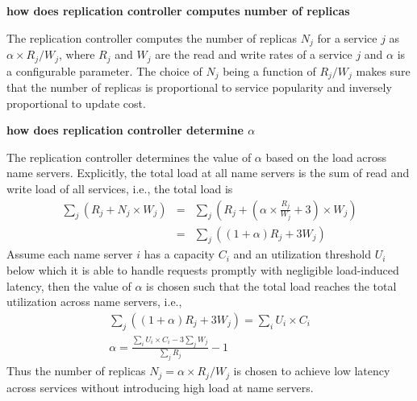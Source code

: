 {{		{\bf how does replication controller computes number of replicas}
		
		The replication controller computes the number of replicas $N_j$ for a service $j$ as $\alpha \times R_j/W_j$, where $R_j$ and $W_j$ are the read and write rates of a service $j$ and $\alpha$ is a configurable parameter. The choice of $N_j$ being a function of $R_j/W_j$ makes sure that the number of replicas is proportional to service popularity and inversely proportional to update cost.
		
		{\bf how does replication controller determine $\alpha$}
		
		The replication controller determines the value of $\alpha$ based on the load across name servers. Explicitly, the total load at all name servers is the sum of read and write load of all services, i.e., the total load is
		\begin{eqnarray}
		\sum_j (R_j + N_j \times W_j) & = & \sum_j (R_j + (\alpha \times \frac{R_j}{W_j} + 3) \times W_j)\nonumber \\ 
		& = & \sum_j ((1 + \alpha)R_j + 3W_j)
		\end{eqnarray}
		Assume each name server $i$ has a capacity $C_i$ and an utilization threshold $U_i$ below which it is able to handle requests promptly with negligible load-induced latency, then the value of $\alpha$ is chosen such that the total load reaches the total utilization across name servers, i.e., 
		\begin{eqnarray}
		\sum_j ( (1 + \alpha) R_j + 3W_j) = \sum_i U_i \times C_i \nonumber \\
		\alpha  =   \frac{\sum_i U_i \times C_i - 3\sum_jW_j}{\sum_j R_j} - 1 
		\end{eqnarray}
		Thus the number of replicas $N_j = \alpha \times R_j/W_j$ is chosen to achieve low latency across services without introducing high load at name servers.
		
		
}}
